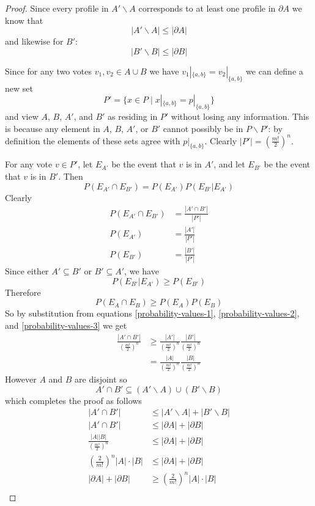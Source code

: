 \begin{proof}
		Since every profile in $A' \backslash A$ corresponds to at least one profile in $\partial A$ we know that
		\[
			|A' \backslash A| \le |\partial A|
		\]
		and likewise for $B'$:
		\[
			|B' \backslash B| \le |\partial B|
		\]

		Since for any two votes $v_1, v_2 \in A \cup B$ we have $v_1|_{\{a,b\}} = v_2|_{\{a,b\}}$ we can define a new set
		\[
			P' = \{x \in P \mid x|_{\{a,b\}} = p|_{\{a,b\}}\}
		\]
		and view $A$, $B$, $A'$, and $B'$ as residing in $P'$ without losing any information. This is because any element in $A$, $B$, $A'$, or $B'$ cannot possibly be in $P \backslash P'$: by definition the elements of these sets agree with $p|_{\{a,b\}}$. Clearly $|P'| = (\frac{m!}{2})^n$.

		For any vote $v \in P'$, let $E_{A'}$ be the event that $v$ is in $A'$, and let $E_{B'}$ be the event that $v$ is in $B'$. Then
		\[
			P(E_{A'} \cap E_{B'}) = P(E_{A'}) P(E_{B'}|E_{A'})
		\]
		Clearly
		\begin{align}
			\label{probability-values-1}
			P(E_{A'} \cap E_{B'}) &= \frac{|A' \cap B'|}{|P'|} \\
			\label{probability-values-2}
			P(E_{A'}) &= \frac{|A'|}{|P'|} \\
			\label{probability-values-3}
			P(E_{B'}) &= \frac{|B'|}{|P'|}
		\end{align}
		Since either $A' \subseteq B'$ or $B' \subseteq A'$, we have
		\[
			P(E_{B'}|E_{A'}) \ge P(E_{B'})
		\]
		Therefore
		\[
			P(E_A \cap E_B) \ge P(E_A) P(E_B)
		\]
		So by substitution from equations \ref{probability-values-1}, \ref{probability-values-2}, and \ref{probability-values-3} we get
		\begin{align*}
			\frac{|A' \cap B'|}{(\frac{m!}{2})^n} &\ge \frac{|A'|}{(\frac{m!}{2})^n} \frac{|B'|}{(\frac{m!}{2})^n} \\
			&= \frac{|A|}{(\frac{m!}{2})^n} \frac{|B|}{(\frac{m!}{2})^n}
		\end{align*}
		However $A$ and $B$ are disjoint so
		\[
			A' \cap B' \subseteq (A' \backslash A) \cup (B' \backslash B)
		\]
		which completes the proof as follows
		\begin{align*}
			|A' \cap B'| &\le |A' \backslash A| + |B' \backslash B| \\
			|A' \cap B'| &\le |\partial A| + |\partial B| \\
			\frac{|A||B|}{(\frac{m!}{2})^n} &\le |\partial A| + |\partial B| \\
			\left(\frac{2}{m!}\right)^n |A| \cdot |B| &\le |\partial A| + |\partial B| \\
			|\partial A| + |\partial B| &\ge \left(\frac{2}{m!}\right)^n |A| \cdot |B| \\
		\end{align*}
	\end{proof}

